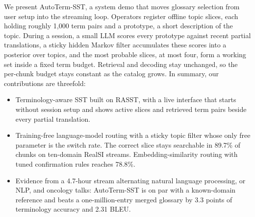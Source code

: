 We present AutoTerm-SST, a system demo that moves glossary selection from user
setup into the streaming loop. Operators register offline topic slices, each
holding roughly 1,000 term pairs and a prototype, a short description of the
topic. During a session, a small LLM scores every prototype against recent
partial translations, a sticky hidden Markov filter accumulates these scores
into a posterior over topics, and the most probable slices, at most four, form
a working set inside a fixed term budget. Retrieval and decoding stay
unchanged, so the per-chunk budget stays constant as the catalog grows. In
summary, our contributions are threefold:
\begin{itemize}
\item Terminology-aware SST built on RASST, with a live interface that starts
without session setup and shows active slices and retrieved term pairs beside
every partial translation.
\item Training-free language-model routing with a sticky topic filter whose
only free parameter is the switch rate. The correct slice stays searchable
in 89.7\% of chunks on ten-domain RealSI streams. Embedding-similarity
routing with tuned confirmation rules reaches 78.8\%.
\item Evidence from a 4.7-hour stream alternating natural language processing,
or NLP, and oncology talks: AutoTerm-SST is on par with a known-domain reference and beats a
one-million-entry merged glossary by 3.3 points of terminology accuracy and
2.31 BLEU.
\end{itemize}
